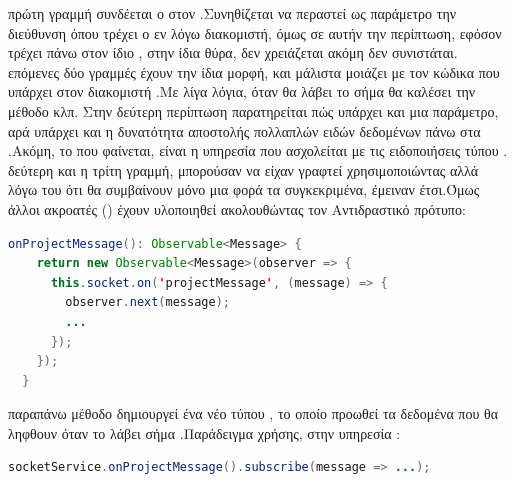  πρώτη γραμμή συνδέεται ο  στον .Συνηθίζεται να περαστεί ως παράμετρο την διεύθυνση όπου τρέχει ο εν λόγω διακομιστή, όμως σε αυτήν την περίπτωση, εφόσον τρέχει πάνω στον ίδιο , στην ίδια θύρα, δεν χρειάζεται ακόμη δεν συνιστάται.\\
 επόμενες δύο γραμμές έχουν την ίδια μορφή, και μάλιστα μοιάζει με τον κώδικα που υπάρχει στον διακομιστή .Με λίγα λόγια, όταν θα λάβει το σήμα  θα καλέσει την μέθοδο  κλπ.
Στην δεύτερη περίπτωση παρατηρείται πώς υπάρχει και μια παράμετρο, αρά υπάρχει και η δυνατότητα αποστολής πολλαπλών ειδών δεδομένων πάνω στα .Ακόμη, το  που φαίνεται, είναι η υπηρεσία που ασχολείται με τις ειδοποιήσεις τύπου .\\
 δεύτερη και η τρίτη γραμμή, μπορούσαν να είχαν γραφτεί χρησιμοποιώντας  αλλά λόγω του ότι θα συμβαίνουν μόνο μια φορά τα συγκεκριμένα, έμειναν έτσι.Όμως άλλοι ακροατές () έχουν υλοποιηθεί ακολουθώντας τον Αντιδραστικό πρότυπο:\\

	\begin{lstlisting}[language=Java]
onProjectMessage(): Observable<Message> {
    return new Observable<Message>(observer => {
      this.socket.on('projectMessage', (message) => {
        observer.next(message);
        ...
      });
    });
  }
	\end{lstlisting}

 παραπάνω μέθοδο δημιουργεί ένα νέο  τύπου , το οποίο προωθεί τα δεδομένα που θα ληφθουν όταν το  λάβει σήμα .Παράδειγμα χρήσης, στην υπηρεσία :\\

	\begin{lstlisting}[language=Java]
socketService.onProjectMessage().subscribe(message => ...);
	\end{lstlisting}
